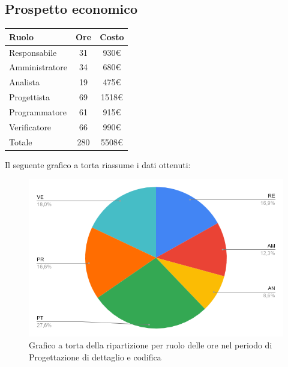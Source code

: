{{{{{{{\subsection{Prospetto economico}\label{PreventivoFaseDiProgettazioneDiDettaglioECodificaProspettoEconomico}
\quad
\def\tabularxcolumn#1{m{#1}}
{	
	\begin{center}
		\renewcommand{\arraystretch}{1.4}
		\begin{tabularx}{7cm}{|X|c|c|}
			\hline
			\rowcolor{airforceblue}
			\textbf{Ruolo} & \textbf{Ore} & \textbf{Costo}\\
			\hline
			Responsabile & 31 & 930\euro\\
			\hline
			Amministratore & 34 & 680\euro\\
			\hline
			Analista & 19 & 475\euro\\
			\hline
			Progettista & 69 & 1518\euro\\
			\hline
			Programmatore & 61 & 915\euro\\
			\hline
			Verificatore & 66 & 990\euro\\
			\hline
			Totale & 280 & 5508\euro\\
			\hline
		\end{tabularx}
	\end{center}

Il seguente grafico a torta riassume i dati ottenuti:
\begin{figure}[!ht]
	\begin{center}
		\includegraphics[width=0.8\linewidth]{../immagini/pdp/torta_progettazione_dettaglio.png}
		\caption{Grafico a torta della ripartizione per ruolo delle ore nel periodo di Progettazione
			di dettaglio e codifica}
	\end{center}
\end{figure}

}}}}}}}}
